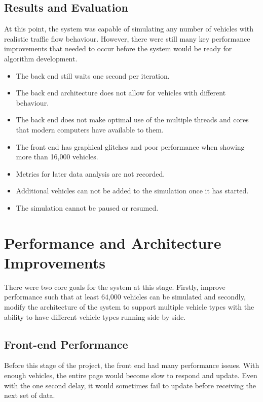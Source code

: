\documentclass[ %
                    author={Alexander Hill},
                supervisor={Dr. Benjamin Sach},
                    degree={MEng},
                     title={MARMOSET},
                  subtitle={Multi-Agent Route Management using Online Simulation for Efficient Transportation},
                      type={research},
                      year={2016} ]{dissertation}
\begin{document}
\subsection{Results and Evaluation}

At this point, the system was capable of simulating any number of vehicles with
realistic traffic flow behaviour. However, there were still many key performance
improvements that needed to occur before the system would be ready for
algorithm development.

\begin{itemize}
    \item The back end still waits one second per iteration.
    \item The back end architecture does not allow for vehicles with different
        behaviour.
    \item The back end does not make optimal use of the multiple threads and
        cores that modern computers have available to them.
    \item The front end has graphical glitches and poor performance when
        showing more than 16,000 vehicles.
    \item Metrics for later data analysis are not recorded.
    \item Additional vehicles can not be added to the simulation once it has
        started.
    \item The simulation cannot be paused or resumed.
\end{itemize}

\section{Performance and Architecture Improvements}\label{sec:arch}

There were two core goals for the system at this stage. Firstly, improve
performance such that at least 64,000 vehicles can be simulated and secondly,
modify the architecture of the system to support multiple vehicle types with the
ability to have different vehicle types running side by side.

\subsection{Front-end Performance}

Before this stage of the project, the front end had many performance issues.
With enough vehicles, the entire page would become slow to respond and update.
Even with the one second delay, it would sometimes fail to update before
receiving the next set of data.
\end{document}
